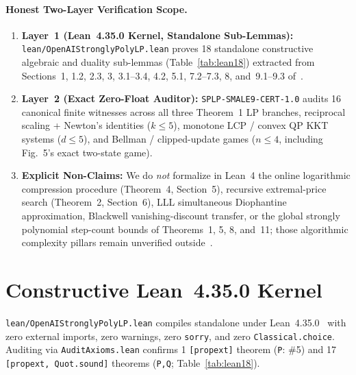 \documentclass[10pt,twocolumn]{article}
\begin{document}
\paragraph{Honest Two-Layer Verification Scope.}
\begin{enumerate}[leftmargin=1.2em,itemsep=1pt,topsep=2pt]
  \item \textbf{Layer~1 (Lean~4.35.0 Kernel, Standalone Sub-Lemmas):} \texttt{lean/OpenAI\allowbreak StronglyPolyLP.lean} proves 18 standalone constructive algebraic and duality sub-lemmas (Table~\ref{tab:lean18}) extracted from Sections~1, 1.2, 2.3, 3, 3.1--3.4, 4.2, 5.1, 7.2--7.3, 8, and~9.1--9.3 of~\cite{openai2026splp}.
  \item \textbf{Layer~2 (Exact Zero-Float Auditor):} \texttt{SPLP-\allowbreak SMALE9-\allowbreak CERT-1.0} audits 16 canonical finite witnesses across all three Theorem~1 LP branches, reciprocal scaling + Newton's identities ($k\le 5$), monotone LCP / convex QP KKT systems ($d\le 5$), and Bellman / clipped-update games ($n\le 4$, including Fig.~5's exact two-state game).
  \item \textbf{Explicit Non-Claims:} We do \emph{not} formalize in Lean~4 the online logarithmic compression procedure (Theorem~4, Section~5), recursive extremal-price search (Theorem~2, Section~6), LLL simultaneous Diophantine approximation, Blackwell vanishing-discount transfer, or the global strongly polynomial step-count bounds of Theorems~1, 5, 8, and~11; those algorithmic complexity pillars remain unverified outside~\cite{openai2026splp}.
\end{enumerate}

\section{Constructive Lean~4.35.0 Kernel}\label{sec:lean}
\texttt{lean/OpenAI\allowbreak StronglyPolyLP.lean} compiles standalone under Lean~4.35.0~\cite{demoura2021lean4} with zero external imports, zero warnings, zero \texttt{sorry}, and zero \texttt{Classical.choice}. Auditing via \texttt{AuditAxioms.lean} confirms 1 \texttt{[propext]} theorem (\texttt{P}: \#5) and 17 \texttt{[propext, Quot.sound]} theorems (\texttt{P,Q}; Table~\ref{tab:lean18}).
\end{document}
